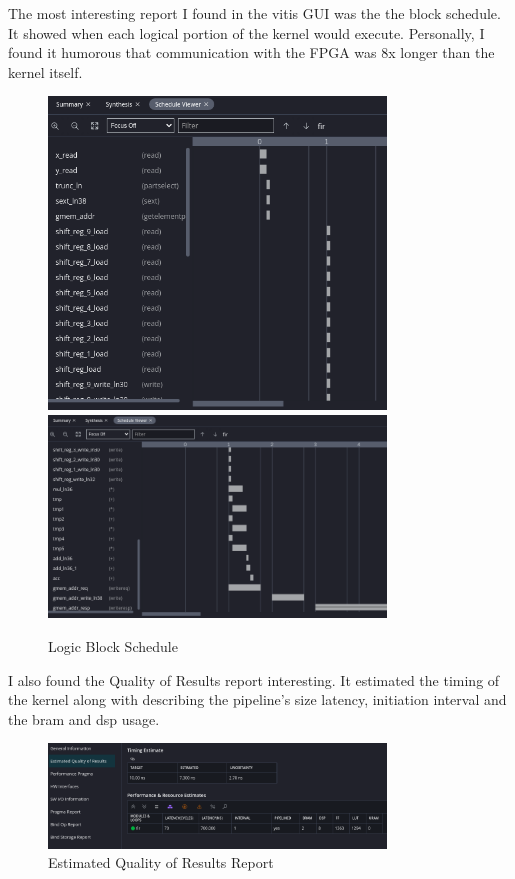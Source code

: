 \documentclass[11pt]{article}
\begin{document}
      The most interesting report I found in the vitis GUI was the the block schedule. It showed
      when each logical portion of the kernel would execute. Personally, I found it humorous that
      communication with the FPGA was 8x longer than the kernel itself.

      \begin{figure}[H]
        \centering
        \includegraphics[width=0.8\textwidth]{vitis_sched_1.png}
        \hfill
        \includegraphics[width=0.8\textwidth]{vitis_sched_2.png}
        \caption{Logic Block Schedule}
        \label{fig:vitis_sched_2}
      \end{figure}

      I also found the Quality of Results report interesting. It estimated the timing of the kernel along
      with describing the pipeline's size latency, initiation interval and the bram and dsp usage.

      \begin{figure}[H]
        \centering
        \includegraphics[width=0.8\textwidth]{vitis_QoR.png}
        \caption{Estimated Quality of Results Report}
        \label{fig:vitis_QoR}
      \end{figure}
\end{document}
